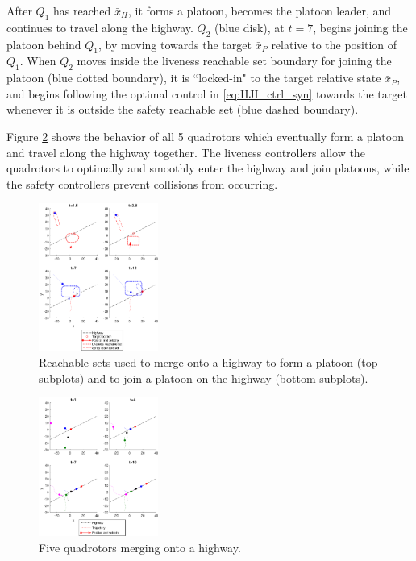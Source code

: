 After $Q_1$ has reached $\bar{x}_H$, it forms a platoon, becomes the platoon leader, and continues to travel along the highway. $Q_2$ (blue disk), at $t=7$, begins joining the platoon behind $Q_1$, by moving towards the target $\bar{x}_P$ relative to the position of $Q_1$. When $Q_2$ moves inside the liveness reachable set boundary for joining the platoon (blue dotted boundary), it is ``locked-in" to the target relative state $\bar{x}_P$, and begins following the optimal control in \eqref{eq:HJI_ctrl_syn} towards the target whenever it is outside the safety reachable set (blue dashed boundary).

Figure \ref{fig:normal5} shows the behavior of all 5 quadrotors which eventually form a platoon and travel along the highway together. The liveness controllers allow the quadrotors to optimally and smoothly enter the highway and join platoons, while the safety controllers prevent collisions from occurring.

\begin{figure}
	\centering
	\includegraphics[width=0.35\textwidth]{"fig/normal2"}
	\caption{Reachable sets used to merge onto a highway to form a platoon (top subplots) and to join a platoon on the highway (bottom subplots).}
	\label{fig:normal2}
\end{figure}

\begin{figure}
	\centering
	\includegraphics[width=0.35\textwidth]{"fig/normal5"}
	\caption{Five quadrotors merging onto a highway.}
	\label{fig:normal5}
\end{figure}

